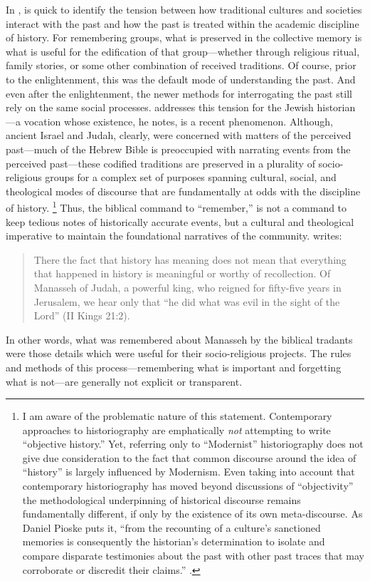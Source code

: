 In , \yerushalmi is quick to identify the tension between how traditional cultures and societies interact with the past and how the past is treated within the academic discipline of history. For remembering groups, what is preserved in the collective memory is what is useful for the edification of that group---whether through religious ritual, family stories, or some other combination of received traditions. Of course, prior to the enlightenment, this was the default mode of understanding the past. And even after the enlightenment, the newer methods for interrogating the past still rely on the same social processes. \yerushalmi addresses this tension for the Jewish historian---a vocation whose existence, he notes, is a recent phenomenon.%
    \autocite[81--103]{yerushalmi1989}
Although, ancient Israel and Judah, clearly, were concerned with matters of the perceived past---much of the Hebrew Bible is preoccupied with narrating events from the perceived past---these codified traditions are preserved in a plurality of socio-religious groups for a complex set of purposes spanning cultural, social, and theological modes of discourse that are fundamentally at odds with the discipline of history.%
    \footnote{%
        I am aware of the problematic nature of this statement. Contemporary approaches to historiography are emphatically \emph{not} attempting to write ``objective history.'' Yet, referring only to ``Modernist'' historiography does not give due consideration to the fact that common discourse around the idea of ``history'' is largely influenced by Modernism. Even taking into account that contemporary historiography has moved beyond discussions of ``objectivity'' the methodological underpinning of historical discourse remains fundamentally different, if only by the existence of its own meta-discourse. As Daniel Pioske puts it, ``from the recounting of a culture's sanctioned memories is consequently the historian's determination to isolate and compare disparate testimonies about the past with other past traces that may corroborate or discredit their claims.''
        \cite[12--13]{pioske_bibint2015}.}
Thus, the biblical command to ``remember,'' is not a command to keep tedious notes of historically accurate events, but a cultural and theological imperative to maintain the foundational narratives of the community. \yerushalmi writes:  

\begin{quote}
    There the fact that history has meaning does not mean that everything that happened in history is meaningful or worthy of recollection. Of Manasseh of Judah, a powerful king, who reigned for fifty-five years in Jerusalem, we hear only that ``he did what was evil in the sight of the Lord'' (II Kings 21:2).%
        \autocite[10]{yerushalmi1989}
\end{quote}  
\noindent
In other words, what was remembered about Manasseh by the biblical tradants were those details which were useful for their socio-religious projects. The rules and methods of this process---remembering what is important and forgetting what is not---are generally not explicit or transparent.  

